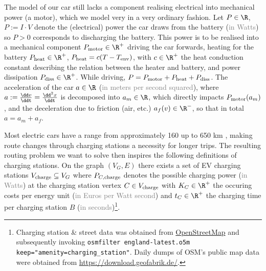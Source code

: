 \documentclass{prettytex/ox/mmsc-special-topic}
\begin{document}
  The model of our car still lacks a component realising electrical into mechanical power (a motor), which we model very in a very ordinary fashion.
  Let $P \in \R$, $P := I \cdot V$ denote the (electrical) power the car draws from the battery (\textcolor{gray}{in Watts}) so $P > 0$ corresponds to discharging the battery.
  This power is to be realised into a mechanical component $P_{\rm motor} \in \R^+$ driving the car forwards, heating for the battery $P_{\rm heat} \in \R^+$, $P_{\rm heat} = c (T - T_{\rm env})$, with $c \in \R^+$ the heat conduction constant describing the relation between the heater and battery, and power dissipation $P_{\rm diss} \in \R^+$.
  While driving, $P = P_{\rm motor} + P_{\rm heat} + P_{\rm diss}$.
  The acceleration of the car $a \in \R$ (\textcolor{gray}{in meters per second squared}), where $a := \frac{\dd v}{\ddt} = \frac{\dd^2 x}{\ddt}$ is decomposed into $a_m \in \R$, which directly impacts $P_{\rm motor}(a_m)$, and the deceleration due to friction (air, etc.) $a_f(v) \in \R^-$, so that in total $a = a_m + a_f$.

  Most electric cars have a range from approximately 160 up to 650 km \parencite{range}, making route changes through charging stations a necessity for longer trips.
  The resulting routing problem we want to solve then inspires the following definitions of charging stations.
  On the graph $(V_G, E)$ there exists a set of EV charging stations $V_{\rm charge} \subseteq V_G$ where $P_{C,\rm charge}$ denotes the possible charging power (\textcolor{gray}{in Watts}) at the charging station vertex $C \in V_{\rm charge}$ with $K_C \in \R^+$ the occuring costs per energy unit (\textcolor{gray}{in Euros per Watt second}) and $t_C \in \R^+$ the charging time per charging station $B$ (\textcolor{gray}{in seconds})\footnote{
    Charging station \& street data was obtained from \href{https://osm.org/}{OpenStreetMap} and subsequently invoking
    \texttt{osmfilter england-latest.o5m \-\-keep="amenity=charging\_station"}.
    Daily dumps of OSM's public map data were obtained from \url{https://download.geofabrik.de/}.
  }.
\end{document}
